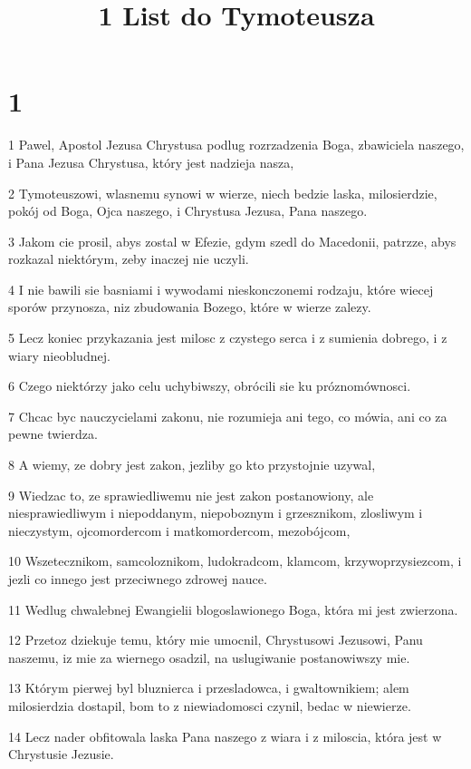 

\title{1 List do Tymoteusza}


\chapter{1}

\par 1 Pawel, Apostol Jezusa Chrystusa podlug rozrzadzenia Boga, zbawiciela naszego, i Pana Jezusa Chrystusa, który jest nadzieja nasza,
\par 2 Tymoteuszowi, wlasnemu synowi w wierze, niech bedzie laska, milosierdzie, pokój od Boga, Ojca naszego, i Chrystusa Jezusa, Pana naszego.
\par 3 Jakom cie prosil, abys zostal w Efezie, gdym szedl do Macedonii, patrzze, abys rozkazal niektórym, zeby inaczej nie uczyli.
\par 4 I nie bawili sie basniami i wywodami nieskonczonemi rodzaju, które wiecej sporów przynosza, niz zbudowania Bozego, które w wierze zalezy.
\par 5 Lecz koniec przykazania jest milosc z czystego serca i z sumienia dobrego, i z wiary nieobludnej.
\par 6 Czego niektórzy jako celu uchybiwszy, obrócili sie ku próznomównosci.
\par 7 Chcac byc nauczycielami zakonu, nie rozumieja ani tego, co mówia, ani co za pewne twierdza.
\par 8 A wiemy, ze dobry jest zakon, jezliby go kto przystojnie uzywal,
\par 9 Wiedzac to, ze sprawiedliwemu nie jest zakon postanowiony, ale niesprawiedliwym i niepoddanym, niepoboznym i grzesznikom, zlosliwym i nieczystym, ojcomordercom i matkomordercom, mezobójcom,
\par 10 Wszetecznikom, samcoloznikom, ludokradcom, klamcom, krzywoprzysiezcom, i jezli co innego jest przeciwnego zdrowej nauce.
\par 11 Wedlug chwalebnej Ewangielii blogoslawionego Boga, która mi jest zwierzona.
\par 12 Przetoz dziekuje temu, który mie umocnil, Chrystusowi Jezusowi, Panu naszemu, iz mie za wiernego osadzil, na uslugiwanie postanowiwszy mie.
\par 13 Którym pierwej byl bluznierca i przesladowca, i gwaltownikiem; alem milosierdzia dostapil, bom to z niewiadomosci czynil, bedac w niewierze.
\par 14 Lecz nader obfitowala laska Pana naszego z wiara i z miloscia, która jest w Chrystusie Jezusie.
